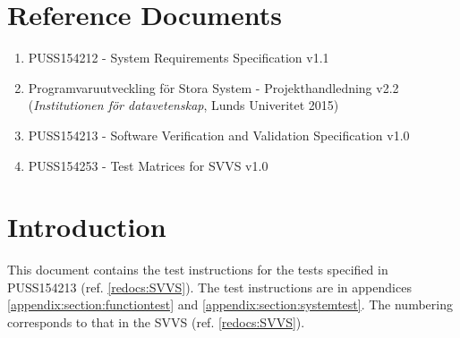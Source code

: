 \documentclass[a4paper]{article}
\begin{document}
\setcounter{tocdepth}{2}
\tableofcontents
\newpage
{}


\section{Reference Documents}
\begin{enumerate}
\item PUSS154212 - System Requirements Specification v1.1 \label{refdocs:srs} 
\item Programvaruutveckling för Stora System - Projekthandledning v2.2 \newline (\textit{Institutionen för datavetenskap}, Lunds Univeritet 2015) \label{refdocs:projekthandledning}
\item PUSS154213 - Software Verification and Validation Specification v1.0 \label{redocs:SVVS}
\item PUSS154253 - Test Matrices for SVVS v1.0 \label{refdocs:matrices}
\end{enumerate}

\section{Introduction}
This document contains the test instructions for the tests specified in PUSS154213 (ref. \ref{redocs:SVVS}). The test instructions are in appendices \ref{appendix:section:functiontest} and \ref{appendix:section:systemtest}. The numbering corresponds to that in the SVVS (ref. \ref{redocs:SVVS}).
\end{document}
